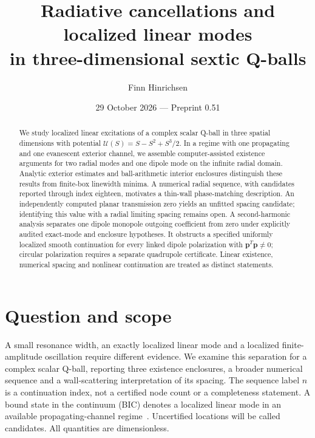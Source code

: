 \documentclass[a4paper,11pt]{article}
\title{Radiative cancellations and localized linear modes\\in three-dimensional sextic Q-balls}
\author{Finn Hinrichsen}
\date{29 October 2026 --- Preprint 0.51}
\begin{document}
\maketitle
\begin{abstract}
We study localized linear excitations of a complex scalar Q-ball in three
spatial dimensions with potential $\mathcal U(S)=S-S^2+S^3/2$.
In a regime with one propagating and one evanescent exterior channel,
we assemble computer-assisted existence arguments for two radial modes
and one dipole mode on the infinite radial domain. Analytic exterior
estimates and ball-arithmetic interior enclosures distinguish these
results from finite-box linewidth minima. A numerical radial sequence,
with candidates reported through index eighteen, motivates a thin-wall
phase-matching description. An independently computed planar transmission
zero yields an unfitted spacing candidate; identifying this value with
a radial limiting spacing remains open. A second-harmonic analysis
separates one dipole monopole outgoing coefficient from zero under
explicitly audited exact-mode and enclosure hypotheses. It obstructs a
specified uniformly localized smooth continuation for every linked dipole
polarization with $\boldsymbol p^T\boldsymbol p\ne0$; circular polarization
requires a separate quadrupole certificate. Linear existence, numerical
spacing and nonlinear continuation are treated as distinct statements.
\end{abstract}

\section{Question and scope}\label{sec:scope}
A small resonance width, an exactly localized linear mode and a localized
finite-amplitude oscillation require different evidence. We examine this
separation for a complex scalar Q-ball, reporting three existence
enclosures, a broader numerical sequence and a wall-scattering
interpretation of its spacing. The sequence label $n$ is a continuation
index, not a certified node count or a completeness statement.
A bound state in the continuum (BIC) denotes a localized linear mode in
an available propagating-channel regime~\cite{Hsu2016}. Uncertified
locations will be called candidates. All quantities are dimensionless.

\end{document}
